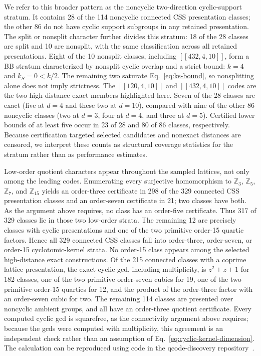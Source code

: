 \documentclass[aps,prx,twocolumn,superscriptaddress,nofootinbib,floatfix]{revtex4-2}
\newcommand{\code}[1]{\ensuremath{\left[\!\left[#1\right]\!\right]}}
\begin{document}
We refer to this broader pattern as the noncyclic two-direction
cyclic-support stratum.  It contains 28 of the 114 noncyclic connected CSS
presentation classes; the other 86 do not have cyclic support subgroups in any
retained presentation.  The split or nonsplit character further divides this
stratum: 18 of the 28 classes are split and 10 are nonsplit, with the same
classification across all retained presentations.  Eight of the 10 nonsplit
classes, including $\code{432,4,10}$, form a BB stratum
characterized by nonsplit cyclic overlap and a strict bound:
$k=4$ and $k_S=0<k/2$.  The remaining two saturate
Eq.~\eqref{eq:ks-bound}, so nonsplitting alone does not imply strictness.  The
$\code{120,4,10}$ and
$\code{432,4,10}$ codes are the two high-distance exact members highlighted
here.  Seven of the 28 classes are exact (five at $d=4$ and these two at
$d=10$), compared with nine of the other 86 noncyclic classes (two at $d=3$,
four at $d=4$, and three at $d=5$).  Certified lower bounds of at least five
occur in 23 of 28 and 80 of 86 classes, respectively.  Because certification
targeted selected candidates and nonexact distances are censored, we interpret
these counts as structural coverage statistics for the stratum rather than as
performance estimates.

Low-order quotient characters appear throughout the sampled lattices, not only
among the leading codes.  Enumerating every surjective homomorphism to
$\mathbb Z_3$, $\mathbb Z_5$, $\mathbb Z_7$, and $\mathbb Z_{15}$ yields an
order-three certificate in 298 of the 329 connected CSS
presentation classes and an order-seven certificate in 21; two classes have both.
As the argument above requires, no class has an order-five certificate.
Thus 317 of 329 classes lie in those
two
low-order strata.  The remaining 12 are precisely classes with cyclic
presentations and one of
the two primitive order-15 quartic factors.  Hence all 329 connected CSS
classes fall into order-three, order-seven, or order-15 cyclotomic-kernel
strata.  No order-15 class appears among the selected
high-distance exact constructions.  Of the 215 connected classes with a
coprime lattice presentation, the exact cyclic gcd, including multiplicity, is
$z^2+z+1$ for 182 classes, one of the two primitive order-seven cubics for 19,
one of the two primitive order-15 quartics for 12, and the product of the
order-three factor with an order-seven cubic for two.  The remaining 114
classes are presented over noncyclic ambient groups, and all have an order-three
quotient certificate.  Every computed cyclic gcd is squarefree, as the
connectivity argument above requires; because the gcds were computed with
multiplicity, this agreement is an independent check rather than an assumption
of Eq.~\eqref{eq:cyclic-kernel-dimension}.
The calculation can be reproduced using code in the qcode-discovery
repository~\cite{cruzbenito2026qcode}.
\end{document}

